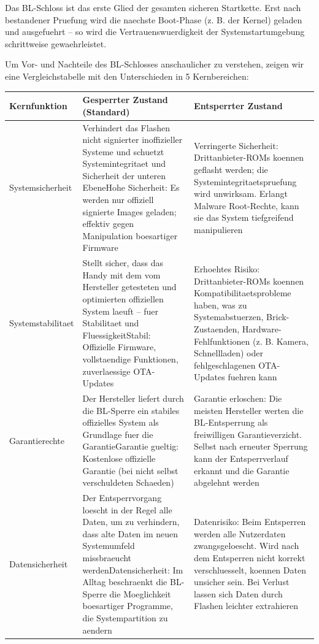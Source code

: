
Das BL-Schloss ist das erste Glied der gesamten sicheren Startkette. Erst nach bestandener Pruefung wird die naechste Boot-Phase (z. B. der Kernel) geladen und ausgefuehrt – so wird die Vertrauenswuerdigkeit der Systemstartumgebung schrittweise gewaehrleistet.


Um Vor- und Nachteile des BL-Schlosses anschaulicher zu verstehen, zeigen wir eine Vergleichstabelle mit den Unterschieden in 5 Kernbereichen:

\begin{center}
\begin{tabularx}{\linewidth}{|X|X|X|}
\hline
\textbf{Kernfunktion} & \textbf{Gesperrter Zustand (Standard)} & \textbf{Entsperrter Zustand} \tabularnewline
\hline
Systemsicherheit & Verhindert das Flashen nicht signierter inoffizieller Systeme und schuetzt Systemintegritaet und Sicherheit der unteren Ebene\newline Hohe Sicherheit: Es werden nur offiziell signierte Images geladen; effektiv gegen Manipulation boesartiger Firmware & Verringerte Sicherheit: Drittanbieter-ROMs koennen geflasht werden; die Systemintegritaetspruefung wird unwirksam. Erlangt Malware Root-Rechte, kann sie das System tiefgreifend manipulieren \tabularnewline
Systemstabilitaet & Stellt sicher, dass das Handy mit dem vom Hersteller getesteten und optimierten offiziellen System laeuft – fuer Stabilitaet und Fluessigkeit\newline Stabil: Offizielle Firmware, vollstaendige Funktionen, zuverlaessige OTA-Updates & Erhoehtes Risiko: Drittanbieter-ROMs koennen Kompatibilitaetsprobleme haben, was zu Systemabstuerzen, Brick-Zustaenden, Hardware-Fehlfunktionen (z. B. Kamera, Schnellladen) oder fehlgeschlagenen OTA-Updates fuehren kann \tabularnewline
Garantierechte & Der Hersteller liefert durch die BL-Sperre ein stabiles offizielles System als Grundlage fuer die Garantie\newline Garantie gueltig: Kostenlose offizielle Garantie (bei nicht selbst verschuldeten Schaeden) & Garantie erloschen: Die meisten Hersteller werten die BL-Entsperrung als freiwilligen Garantieverzicht. Selbst nach erneuter Sperrung kann der Entsperrverlauf erkannt und die Garantie abgelehnt werden \tabularnewline
Datensicherheit & Der Entsperrvorgang loescht in der Regel alle Daten, um zu verhindern, dass alte Daten im neuen Systemumfeld missbraeucht werden\newline Datensicherheit: Im Alltag beschraenkt die BL-Sperre die Moeglichkeit boesartiger Programme, die Systempartition zu aendern & Datenrisiko: Beim Entsperren werden alle Nutzerdaten zwangsgeloescht. Wird nach dem Entsperren nicht korrekt verschluesselt, koennen Daten unsicher sein. Bei Verlust lassen sich Daten durch Flashen leichter extrahieren \tabularnewline

\end{tabularx}
\end{center}
